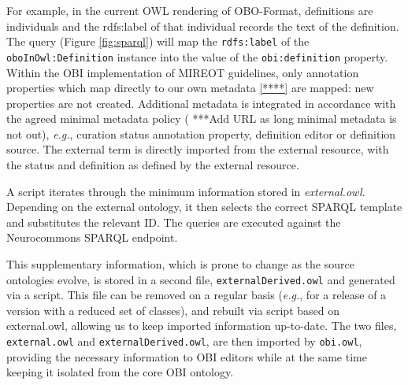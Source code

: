 \documentclass[a4paper,10pt,twocolumn]{article}
\begin{document}
For example, in the current \ac{OWL} rendering of \ac{OBO}-Format, definitions are individuals and the rdfs:label of that individual records the text of the definition. %
The query (Figure \ref{fig:sparql}) will map the \texttt{rdfs:label} of the \texttt{oboInOwl:Definition} instance into the value of the \texttt{obi:definition} property.
Within the \ac{OBI} implementation of \ac{MIREOT} guidelines, only annotation properties which map directly to our own metadata \ref{****} are mapped: new properties are not created.
Additional metadata is integrated in accordance with the agreed minimal metadata policy ( ***Add URL as long minimal metadata is not out), \emph{e.g.}, curation status annotation property, definition editor or definition source.
The external term is directly imported from the external resource, with the status and definition as defined by the external resource. %

A script iterates through the minimum information stored in \emph{external.owl}.
Depending on the external ontology, it then selects the correct SPARQL template and substitutes the relevant ID.
The queries are executed against the Neurocommons SPARQL endpoint\cite{RefWorks:1540}.

This supplementary information, which is prone to change as the source ontologies evolve, is stored in a second file, \texttt{externalDerived.owl} and generated via a script. 
This file can be removed on a regular basis (\emph{e.g.}, for a release of a version with a reduced set of classes), and rebuilt via script based on \texttt{}{external.owl}, allowing us to keep imported information up-to-date.
The two files, \texttt{external.owl} and \texttt{externalDerived.owl}, are then imported by \texttt{obi.owl}, providing the necessary information to OBI editors while at the same time keeping it isolated from the core OBI ontology.
\end{document}

